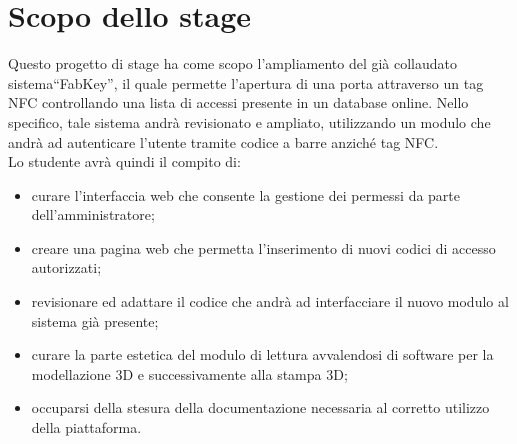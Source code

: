 \section*{Scopo dello stage}
Questo progetto di stage ha come scopo l'ampliamento del già collaudato sistema``FabKey'', il quale permette l'apertura di una porta attraverso un tag NFC controllando una lista di accessi presente in un database online. 
Nello specifico, tale sistema andrà revisionato e ampliato, utilizzando un modulo che andrà ad autenticare l'utente tramite codice a barre anziché tag NFC.\\
Lo studente avrà quindi il compito di:
\begin{itemize}
	\item curare l'interfaccia web che consente la gestione dei permessi da parte dell'amministratore;
	\item creare una pagina web che permetta l'inserimento di nuovi codici di accesso autorizzati;
	\item revisionare ed adattare il codice che andrà ad interfacciare il nuovo modulo al sistema già presente;
	\item curare la parte estetica del modulo di lettura avvalendosi di software per la modellazione 3D e successivamente alla stampa 3D;
	\item occuparsi della stesura della documentazione necessaria al corretto utilizzo della piattaforma.
\end{itemize}
